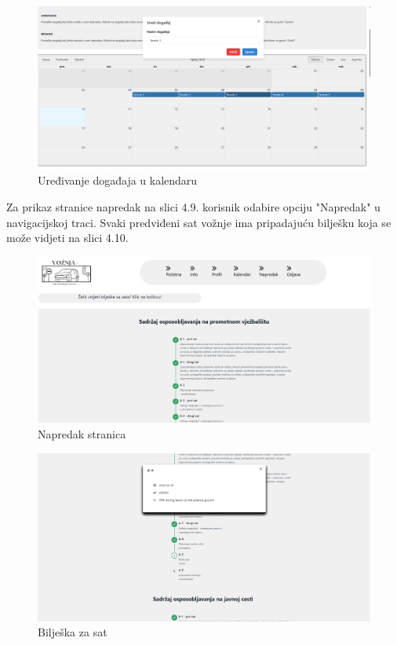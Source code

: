     \begin{figure}[H]
					\includegraphics[width=\textwidth]{slike/kandidat3.png} 
					\centering
					\caption{Uređivanje događaja u kalendaru}
					\label{fig:promjene}
				\end{figure}

\noindent Za prikaz stranice napredak na slici 4.9. korisnik odabire opciju "Napredak" u navigacijskoj traci. Svaki predviđeni sat vožnje ima pripadajuću bilješku koja se može vidjeti na slici 4.10.

\begin{figure}[H]
					\includegraphics[width=\textwidth]{slike/kandidat4.png} 
					\centering
					\caption{Napredak stranica}
					\label{fig:promjene}
				\end{figure}

    \begin{figure}[H]
					\includegraphics[width=\textwidth]{slike/kandidat5.png} 
					\centering
					\caption{Bilješka za sat}
					\label{fig:promjene}
				\end{figure}


